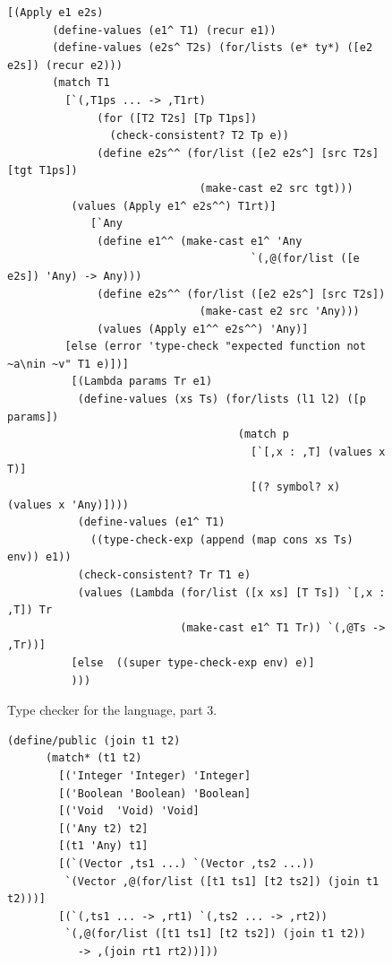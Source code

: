 \documentclass[7x10]{TimesAPriori_MIT}%
\numberwithin{theorem}{chapter}
\numberwithin{definition}{chapter}
\numberwithin{equation}{chapter}
\begin{document}
{\begin{figure}[tbp]
\begin{tcolorbox}[colback=white]
\begin{lstlisting}[basicstyle=\ttfamily\scriptsize]
	  [(Apply e1 e2s)
	   (define-values (e1^ T1) (recur e1))
	   (define-values (e2s^ T2s) (for/lists (e* ty*) ([e2 e2s]) (recur e2)))
	   (match T1
	     [`(,T1ps ... -> ,T1rt)
              (for ([T2 T2s] [Tp T1ps])
                (check-consistent? T2 Tp e))
              (define e2s^^ (for/list ([e2 e2s^] [src T2s] [tgt T1ps])
                              (make-cast e2 src tgt)))
	      (values (Apply e1^ e2s^^) T1rt)]
             [`Any
              (define e1^^ (make-cast e1^ 'Any
                                      `(,@(for/list ([e e2s]) 'Any) -> Any)))
              (define e2s^^ (for/list ([e2 e2s^] [src T2s])
                              (make-cast e2 src 'Any)))
              (values (Apply e1^^ e2s^^) 'Any)]
	     [else (error 'type-check "expected function not ~a\nin ~v" T1 e)])]
          [(Lambda params Tr e1)
           (define-values (xs Ts) (for/lists (l1 l2) ([p params])
                                    (match p
                                      [`[,x : ,T] (values x T)]
                                      [(? symbol? x) (values x 'Any)])))
           (define-values (e1^ T1) 
             ((type-check-exp (append (map cons xs Ts) env)) e1))
           (check-consistent? Tr T1 e)
           (values (Lambda (for/list ([x xs] [T Ts]) `[,x : ,T]) Tr
                           (make-cast e1^ T1 Tr)) `(,@Ts -> ,Tr))]
          [else  ((super type-check-exp env) e)]
          )))
\end{lstlisting}
\end{tcolorbox}
\caption{Type checker for the \LangGrad{} language, part 3.}
\label{fig:type-check-Lgradual-3}
\end{figure}

\begin{figure}[tbp]
\begin{tcolorbox}[colback=white]  
\begin{lstlisting}[basicstyle=\ttfamily\scriptsize]
    (define/public (join t1 t2)
      (match* (t1 t2)
        [('Integer 'Integer) 'Integer]
        [('Boolean 'Boolean) 'Boolean]
        [('Void  'Void) 'Void]
        [('Any t2) t2]
        [(t1 'Any) t1]
        [(`(Vector ,ts1 ...) `(Vector ,ts2 ...))
         `(Vector ,@(for/list ([t1 ts1] [t2 ts2]) (join t1 t2)))]
        [(`(,ts1 ... -> ,rt1) `(,ts2 ... -> ,rt2))
         `(,@(for/list ([t1 ts1] [t2 ts2]) (join t1 t2))
           -> ,(join rt1 rt2))]))


\end{lstlisting}
\end{tcolorbox}
\end{figure}}
\end{document}
